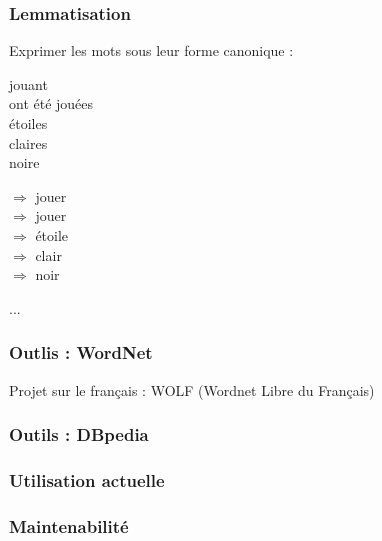 \begin{frame}
  \frametitle{Lemmatisation}
  Exprimer les mots sous leur forme canonique : \\

  \begin{minipage}[l]{0.19\linewidth}
    jouant \\
    ont été jouées \\
    étoiles \\
    claires \\
    noire \\
  \end{minipage}\hfill
  \begin{minipage}[l]{0.80\linewidth}
  $\Rightarrow$ jouer \\
  $\Rightarrow$ jouer \\
  $\Rightarrow$ étoile \\
  $\Rightarrow$ clair \\
  $\Rightarrow$ noir  \\
  \end{minipage}\hfill
  ...
\end{frame}

\begin{frame}
  \frametitle{Outlis : WordNet}
  Projet sur le français : WOLF (Wordnet Libre du Français) 
\end{frame}

\begin{frame}
  \frametitle{Outils : DBpedia}
\end{frame}

\begin{frame}
  \frametitle{Utilisation actuelle}
\end{frame}

\begin{frame}
  \frametitle{Maintenabilité}
\end{frame}

